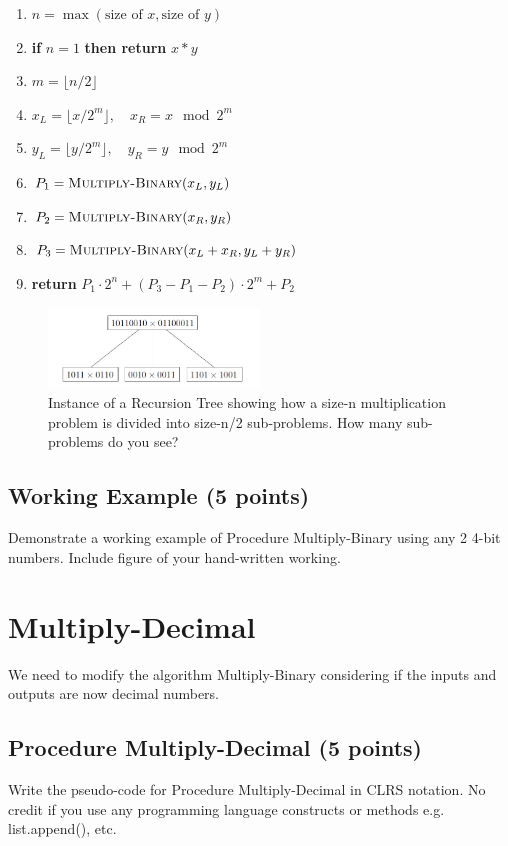 \documentclass[a4paper]{article}
\begin{document}
\begin{enumerate}
    \item $n = \max(\text{size of } x, \text{size of } y)$
    \item \textbf{if} $n = 1$ \textbf{then return} $x * y$
    \item $m = \lfloor n / 2 \rfloor$
    \item $x_L = \lfloor x / 2^m \rfloor, \quad x_R = x \mod 2^m$
    \item $y_L = \lfloor y / 2^m \rfloor, \quad y_R = y \mod 2^m$
    \item $P_1 = \textsc{Multiply-Binary}(x_L, y_L)$
    \item $P_2 = \textsc{Multiply-Binary}(x_R, y_R)$
    \item $P_3 = \textsc{Multiply-Binary}(x_L + x_R, y_L + y_R)$
    \item \textbf{return} $P_1 \cdot 2^n + (P_3 - P_1 - P_2) \cdot 2^m + P_2$
\end{enumerate}

\begin{figure}[h!]
    \centering
    \includegraphics[width=0.5\textwidth]{binary.jpg}
    \caption{Instance of a Recursion Tree showing how a size-n multiplication problem is divided into size-n/2 sub-problems. How many sub-problems do you see?}
    \label{fig:example}
\end{figure}


\subsection{Working Example (5 points)}
Demonstrate a working example of Procedure Multiply-Binary using any 2 4-bit numbers. Include figure of your hand-written working.

\newpage
\section{Multiply-Decimal}
We need to modify the algorithm Multiply-Binary considering if the inputs and outputs are now decimal numbers.

\subsection{Procedure Multiply-Decimal  (5 points)}
Write the pseudo-code for Procedure Multiply-Decimal in CLRS notation. No credit if you use any programming language constructs or methods e.g. list.append(), etc. 
\end{document}
